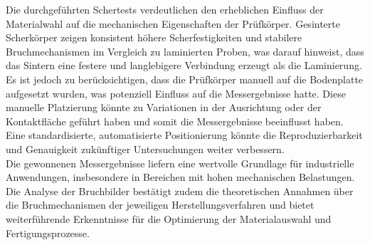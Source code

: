 Die durchgeführten Schertests verdeutlichen den erheblichen Einfluss der Materialwahl auf die mechanischen Eigenschaften der Prüfkörper. Gesinterte Scherkörper zeigen konsistent höhere Scherfestigkeiten und stabilere Bruchmechanismen im Vergleich zu laminierten Proben, was darauf hinweist, dass das Sintern eine festere und langlebigere Verbindung erzeugt als die Laminierung.\\

Es ist jedoch zu berücksichtigen, dass die Prüfkörper manuell auf die Bodenplatte aufgesetzt wurden, was potenziell Einfluss auf die Messergebnisse hatte. Diese manuelle Platzierung könnte zu Variationen in der Ausrichtung oder der Kontaktfläche geführt haben und somit die Messergebnisse beeinflusst haben. Eine standardisierte, automatisierte Positionierung könnte die Reproduzierbarkeit und Genauigkeit zukünftiger Untersuchungen weiter verbessern.\\

Die gewonnenen Messergebnisse liefern eine wertvolle Grundlage für industrielle Anwendungen, insbesondere in Bereichen mit hohen mechanischen Belastungen. Die Analyse der Bruchbilder bestätigt zudem die theoretischen Annahmen über die Bruchmechanismen der jeweiligen Herstellungsverfahren und bietet weiterführende Erkenntnisse für die Optimierung der Materialauswahl und Fertigungsprozesse.